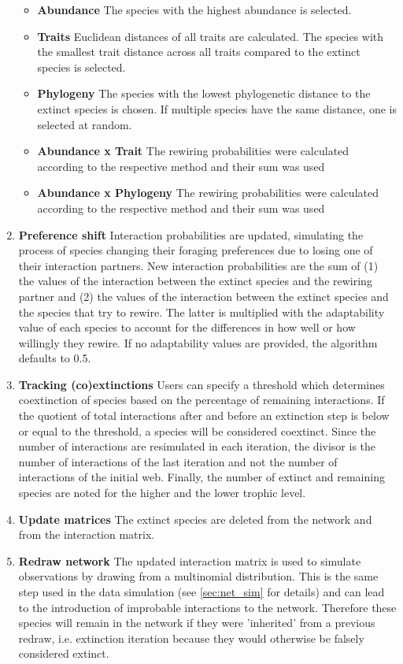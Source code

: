\documentclass[12pt,a4paper]{article}
\begin{document}
\begin{enumerate}
\begin{itemize}
		\item \label{itm:abund_rew} \textbf{Abundance} {\small The species with the highest abundance is selected.}
		\item \label{itm:trait_rew} \textbf{Traits} {\small Euclidean distances of all traits are calculated. The species with the smallest trait distance across all traits compared to the extinct species is selected.}
		\item \label{itm:phylo_rew} \textbf{Phylogeny} {\small The species with the lowest phylogenetic distance to the extinct species is chosen. If multiple species have the same distance, one is selected at random.}
		\item \label{itm:AT_rew} \textbf{Abundance x Trait} {\small The rewiring probabilities were calculated according to the respective method and their sum was used}
		\item \label{itm:AP_rew} \textbf{Abundance x Phylogeny} {\small The rewiring probabilities were calculated according to the respective method and their sum was used}
		\end{itemize}
	\item \label{itm:shift} \textbf{Preference shift} {\small Interaction probabilities are updated, simulating the process of species changing their foraging preferences due to losing one of their interaction partners. New interaction probabilities are the sum of (1) the values of the interaction between the extinct species and the rewiring partner and (2) the values of the interaction between the extinct species and the species that try to rewire. The latter is multiplied with the adaptability value of each species to account for the differences in how well or how willingly they rewire. If no adaptability values are provided, the algorithm defaults to 0.5.}
	\item  \label{itm:track} \textbf{Tracking (co)extinctions} {\small Users can specify a threshold which determines coextinction of species based on the percentage of remaining interactions. If the quotient of total interactions after and before an extinction step is below or equal to the threshold, a species will be considered coextinct. Since the number of interactions are resimulated in each iteration, the divisor is the number of interactions of the last iteration and not the number of interactions of the initial web. Finally, the number of extinct and remaining species are noted for the higher and the lower trophic level.}
	\item \label{itm:update} \textbf{Update matrices} {\small The extinct species are deleted from the network and from the interaction matrix.}
	\item \label{itm:redraw} \textbf{Redraw network} {\small The updated interaction matrix is used to simulate observations by drawing from a multinomial distribution. This is the same step used in the data simulation (see \ref{sec:net_sim} for details) and can lead to the introduction of improbable interactions to the network. Therefore these species will remain in the network if they were 'inherited' from a previous redraw, i.e. extinction iteration because they would otherwise be falsely considered extinct.}
	\end{enumerate}
\end{document}
